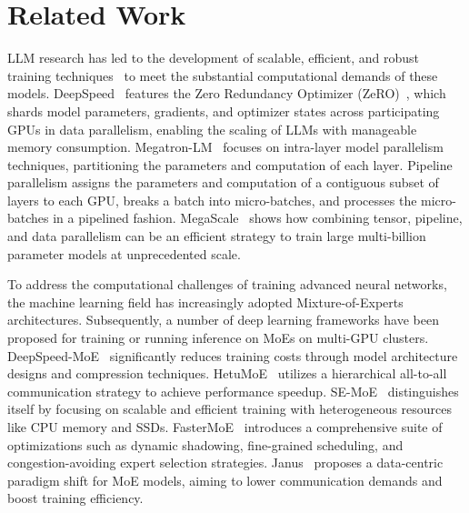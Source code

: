 \section{Related Work}
\label{sec:related}

 LLM research has led to the development of scalable, efficient, and robust training techniques~\cite{rasley2020deepspeed, shoeybi2019megatron, jiang2024megascale, zhang2025disttrain} to meet the substantial computational demands of these models. DeepSpeed~\cite{rasley2020deepspeed} features the Zero Redundancy Optimizer (ZeRO)~\cite{rajbhandari2020zero, rajbhandari2021zero, ren2021zero}, which shards model parameters, gradients, and optimizer states across participating GPUs in data parallelism, enabling the scaling of LLMs with manageable memory consumption. Megatron-LM~\cite{shoeybi2019megatron} focuses on intra-layer model parallelism techniques, partitioning the parameters and computation of each layer. Pipeline parallelism assigns the parameters and computation of a contiguous subset of layers to each GPU\cite{huang2019gpipe, narayanan2019pipedream}, breaks a batch into micro-batches, and processes the micro-batches in a pipelined fashion. MegaScale~\cite{jiang2024megascale} shows how combining tensor, pipeline, and data parallelism can be an efficient strategy to train large multi-billion parameter models at unprecedented scale.

 To address the computational challenges of training advanced neural networks, the machine learning field has increasingly adopted Mixture-of-Experts architectures. Subsequently, a number of deep learning frameworks have been proposed for training or running inference on MoEs on multi-GPU clusters. DeepSpeed-MoE~\cite{rajbhandari2022deepspeed} significantly reduces training costs through model architecture designs and compression techniques. HetuMoE~\cite{nie2022hetumoe} utilizes a hierarchical all-to-all communication strategy to achieve performance speedup. SE-MoE~\cite{shen2022se} distinguishes itself by focusing on scalable and efficient training with heterogeneous resources like CPU memory and SSDs.  FasterMoE~\cite{he2022fastermoe} introduces a comprehensive suite of optimizations such as dynamic shadowing, fine-grained scheduling, and congestion-avoiding expert selection strategies. Janus~\cite{liu2023janus} proposes a data-centric paradigm shift for MoE models, aiming to lower communication demands and boost training efficiency. 

